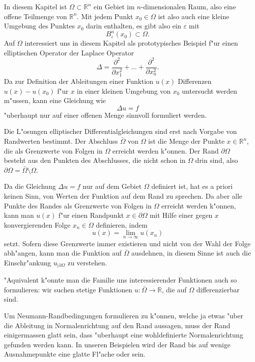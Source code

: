 In diesem Kapitel ist $\Omega\subset\mathbb R^n$ ein Gebiet im
$n$-dimensionalen Raum, also eine offene Teilmenge von $\mathbb R^n$.
Mit jedem Punkt
$x_0\in\Omega$ ist also auch eine kleine Umgebung des Punktes $x_0$
darin enthalten,  es gibt also ein $\varepsilon$ mit
\[
B^n_{\varepsilon}(x_0)\subset\Omega.
\]
Auf $\Omega$ interessiert uns in diesem Kapitel als prototypisches
Beispiel f"ur einen elliptischen Operator der Laplace Operator
\[
\Delta=\frac{\partial^2}{\partial x_1^2}+\dots+\frac{\partial^2}{\partial x_n^2}.
\]
Da zur Definition der Ableitungen einer Funktion $u(x)$ Differenzen $u(x)-u(x_0)$
f"ur $x$ in einer kleinen Umgebung von $x_0$ untersucht werden m"ussen,
kann eine Gleichung wie
\[
\Delta u=f
\]
"uberhaupt nur auf einer offenen Menge sinnvoll formuliert werden.

Die L"osungen elliptischer Differentialgleichungen sind erst nach
Vorgabe von Randwerten bestimmt.
Der Abschluss $\bar\Omega$ von $\Omega$ 
ist die Menge der Punkte $x\in\mathbb R^n$, die als Grenzwerte von
Folgen in $\Omega$ erreicht werden k"onnen. 
Der Rand $\partial \Omega$ besteht aus den Punkten des Abschlusses, die
nicht schon in $\Omega$ drin sind,
also $\partial \Omega=\bar\Omega\setminus\Omega$.

Da die Gleichung $\Delta u=f$ nur auf dem Gebiet $\Omega$ definiert ist, 
hat es a priori keinen Sinn, von Werten der Funktion auf dem Rand zu sprechen.
Da aber alle Punkte des Randes als Grenzwerte von Folgen in $\Omega$ erreicht
werden k"onnen, kann man $u(x)$ f"ur einen Randpunkt $x\in\partial\Omega$
mit Hilfe einer gegen $x$ konvergierenden Folge $x_n\in\Omega$ definieren, indem
\[
u(x)=\lim_{n\to\infty}u(x_n)
\]
setzt. Sofern diese Grenzwerte immer existieren und nicht von der Wahl der
Folge abh"angen, kann man die Funktion auf $\bar\Omega$ ausdehnen,
in diesem Sinne ist auch die Einschr"ankung $u_{|\partial \Omega}$ zu 
verstehen.

"Aquivalent k"onnte man die Familie uns interessierender Funktionen
auch so formulieren: wir suchen stetige Funktionen $u\colon\bar\Omega\to\mathbb R$,
die auf $\Omega$ differenzierbar sind.

Um Neumann-Randbedingungen formulieren zu k"onnen, welche
ja etwas "uber die Ableitung in Normalenrichtung auf den Rand
aussagen, muss der Rand einigermassen glatt sein, dass 
"uberhaupt eine wohldefinierte Normalenrichtung gefunden werden kann.
In unseren Beispielen wird der Rand bis auf wenige Ausnahmepunkte
eine glatte Fl"ache oder sein.

